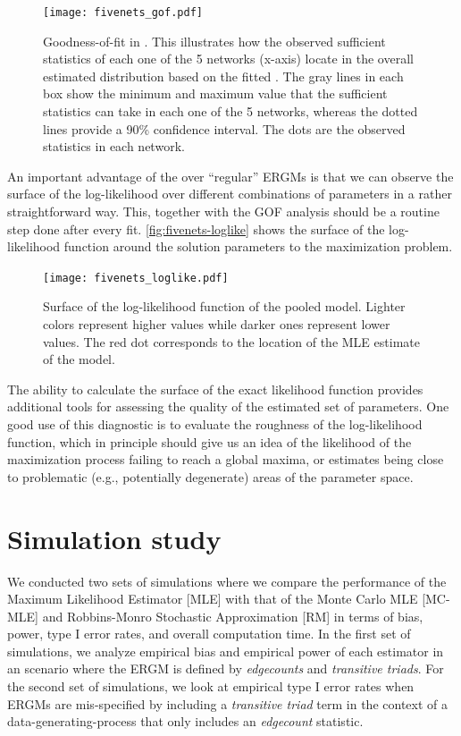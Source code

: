 \documentclass[review, nonatbib,doubleblind]{elsarticle/elsarticle}
\begin{document}
\begin{figure}[tb]
    \centering
    \caption{Goodness-of-fit in \ergmitos{}. This illustrates how the observed sufficient statistics of each one of the 5 networks (x-axis) locate in the overall estimated distribution based on the fitted \ergmito{}. The gray lines in each box show the minimum and maximum value that the sufficient statistics can take in each one of the 5 networks, whereas the dotted lines provide a 90\% confidence interval. The dots are the observed statistics in each network.}
    \texttt{[image: fivenets\_gof.pdf]}
    \label{fig:fivenets-gof}
\end{figure}

An important advantage of the \ergmitos{} over ``regular'' ERGMs is that we can observe the surface of the log-likelihood over different combinations of parameters in a rather straightforward way. This, together with the GOF analysis should be a routine step done after every \ergmito{} fit. \autoref{fig:fivenets-loglike} shows the surface of the log-likelihood function around the solution parameters to the maximization problem.

\begin{figure}[tb]
    \centering
    \caption{Surface of the log-likelihood function of the pooled \ergmito{} model. Lighter colors represent higher values while darker ones represent lower values. The red dot corresponds to the location of the MLE estimate of the model.}
    \texttt{[image: fivenets\_loglike.pdf]}
    \label{fig:fivenets-loglike}
\end{figure}

The ability to calculate the surface of the exact likelihood function provides additional tools for assessing the quality of the estimated set of parameters. One good use of this diagnostic is to evaluate the roughness of the log-likelihood function, which in principle should give us an idea of the likelihood of the maximization process failing to reach a global maxima, or estimates being close to problematic (e.g., potentially degenerate) areas of the parameter space.

\section{Simulation study}

We conducted two sets of simulations where we compare the performance of the Maximum Likelihood Estimator [MLE] with that of the Monte Carlo MLE [MC-MLE] and Robbins-Monro Stochastic Approximation [RM] in terms of bias, power, type I error rates, and overall computation time. In the first set of simulations, we analyze empirical bias and empirical power of each estimator in an scenario where the ERGM is defined by \textit{edgecounts} and \textit{transitive triads}. For the second set of simulations, we look at empirical type I error rates when ERGMs are mis-specified by including a \textit{transitive triad} term in the context of a data-generating-process that only includes an \textit{edgecount} statistic.
\end{document}
